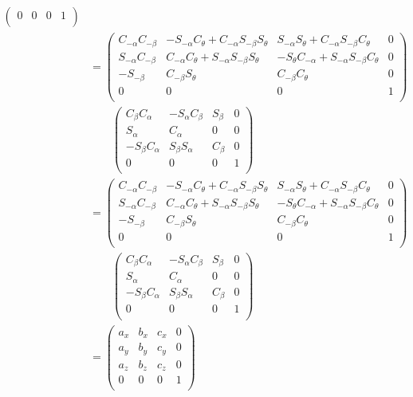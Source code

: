 \documentclass[a4paper,11pt]{article}
\begin{document}
\begin {enumerate}
\begin{align*}
\begin{pmatrix}
				0 & 0 & 0 & 1\\
			\end{pmatrix}\\
			&= \begin{pmatrix}
				C_{-\alpha}C_{-\beta} & -S_{-\alpha}C_{\theta}+C_{-\alpha}S_{-\beta}S_{\theta} & S_{-\alpha}S_{\theta}+C_{-\alpha}S_{-\beta}C_{\theta} & 0\\
				S_{-\alpha}C_{-\beta} & C_{-\alpha}C_{\theta}+S_{-\alpha}S_{-\beta}S_{\theta} & -S_{\theta}C_{-\alpha}+S_{-\alpha}S_{-\beta}C_{\theta} & 0\\
				-S_{-\beta} & C_{-\beta}S_{\theta} & C_{-\beta}C_{\theta} & 0\\
				0 & 0 & 0 & 1\\
			\end{pmatrix}\\
			&\qquad \begin{pmatrix}
				C_{\beta}C_{\alpha} & -S_{\alpha}C_{\beta} & S_{\beta} & 0\\
				S_{\alpha} & C_{\alpha} & 0 & 0\\
				-S_{\beta}C_{\alpha} & S_{\beta}S_{\alpha} & C_{\beta} & 0\\
				0 & 0 & 0 & 1\\
			\end{pmatrix}\\
			&= \begin{pmatrix}
				C_{-\alpha}C_{-\beta} & -S_{-\alpha}C_{\theta}+C_{-\alpha}S_{-\beta}S_{\theta} & S_{-\alpha}S_{\theta}+C_{-\alpha}S_{-\beta}C_{\theta} & 0\\
				S_{-\alpha}C_{-\beta} & C_{-\alpha}C_{\theta}+S_{-\alpha}S_{-\beta}S_{\theta} & -S_{\theta}C_{-\alpha}+S_{-\alpha}S_{-\beta}C_{\theta} & 0\\
				-S_{-\beta} & C_{-\beta}S_{\theta} & C_{-\beta}C_{\theta} & 0\\
				0 & 0 & 0 & 1\\
			\end{pmatrix}\\
			&\qquad \begin{pmatrix}
				C_{\beta}C_{\alpha} & -S_{\alpha}C_{\beta} & S_{\beta} & 0\\
				S_{\alpha} & C_{\alpha} & 0 & 0\\
				-S_{\beta}C_{\alpha} & S_{\beta}S_{\alpha} & C_{\beta} & 0\\
				0 & 0 & 0 & 1\\
			\end{pmatrix}\\
			&= \begin{pmatrix}
				a_x & b_x & c_x & 0\\
				a_y & b_y & c_y & 0\\
				a_z & b_z & c_z & 0\\
				0 & 0 & 0 & 1\\
			\end{pmatrix}\\
		\end{align*}


\end{enumerate}
\end{document}
